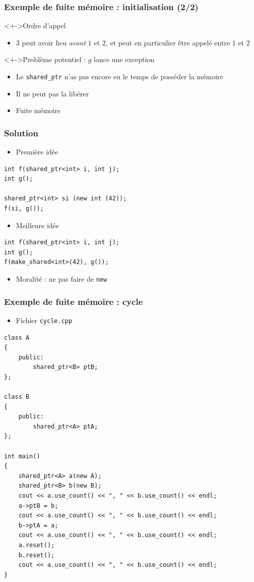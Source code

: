 \begin{frame}
\frametitle{Exemple de fuite mémoire : initialisation (2/2)}
\begin{exampleblock}<+->{Ordre d'appel}
	\begin{itemize}[<+->]
	\item $3$ peut avoir lieu \emph{avant} $1$ et $2$, et peut en particulier être appelé entre $1$ et $2$
	\end{itemize}
\end{exampleblock}
\begin{alertblock}<+->{Problème potentiel : $g$ lance une exception}
	\begin{itemize}
	\item Le \texttt{shared\_ptr} n'as pas encore eu le temps de posséder la mémoire
	\item Il ne peut pas la libérer
	\item Fuite mémoire
	\end{itemize}
\end{alertblock}
\end{frame}

\begin{frame}[containsverbatim]
\frametitle{Solution}
\begin{itemize}
\item Première idée
\end{itemize}
\begin{lstlisting}
int f(shared_ptr<int> i, int j);
int g();

shared_ptr<int> si (new int (42));
f(si, g());
\end{lstlisting}
\begin{itemize}
\item Meilleure idée
\end{itemize}
\begin{lstlisting}
int f(shared_ptr<int> i, int j);
int g();
f(make_shared<int>(42), g());
\end{lstlisting}
\begin{itemize}
\item Moralité : ne pas faire de \lstinline|new|
\end{itemize}
\end{frame}

\begin{frame}[containsverbatim]
\frametitle{Exemple de fuite mémoire : cycle}
\begin{itemize}
\item Fichier \texttt{cycle.cpp}
\end{itemize}
\begin{lstlisting}
class A
{
	public:
	    shared_ptr<B> ptB;
};

class B
{
    public:
	    shared_ptr<A> ptA;
};

int main()
{
	shared_ptr<A> a(new A);
	shared_ptr<B> b(new B);
	cout << a.use_count() << ", " << b.use_count() << endl;
	a->ptB = b;
	cout << a.use_count() << ", " << b.use_count() << endl;
	b->ptA = a;
	cout << a.use_count() << ", " << b.use_count() << endl;
	a.reset();
	b.reset();
	cout << a.use_count() << ", " << b.use_count() << endl;
}
\end{lstlisting}
\end{frame}

